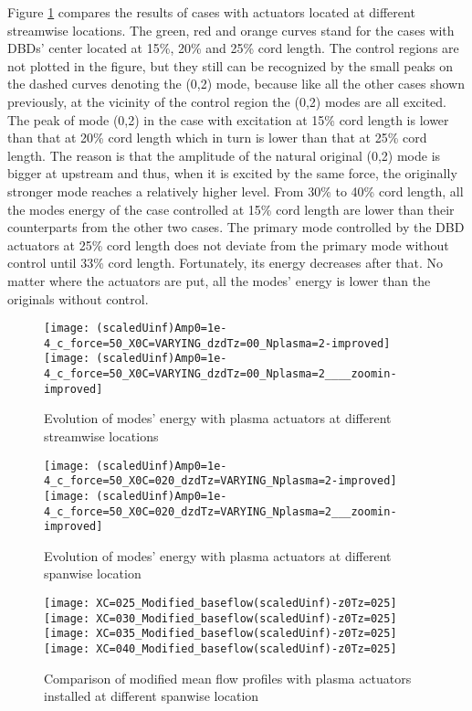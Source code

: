 \documentclass{AIAA}
\begin{document}
Figure \ref{f:streamwiselocationeffect} compares the results of cases with actuators located at different streamwise locations. The green, red and orange curves stand for the cases with DBDs' center located at 15\%, 20\% and 25\% cord length. The control regions are not plotted in the figure, but they still can be recognized by the small peaks on the dashed curves denoting the (0,2) mode, because like all the other cases shown previously, at the vicinity of the control region the (0,2) modes are all excited. The peak of mode (0,2) in the case with excitation at 15\% cord length is lower than that at 20\% cord length which in turn is lower than that at 25\% cord length. The reason is that the amplitude of the natural original (0,2) mode is bigger at upstream and thus, when it is excited by the same force, the originally stronger mode reaches a relatively higher level. From 30\% to 40\% cord length, all the modes energy of the case controlled at 15\% cord length are lower than their counterparts from the other two cases. The primary mode controlled by the DBD actuators at 25\% cord length does not deviate from the primary mode without control until 33\% cord length. Fortunately, its energy decreases after that. No matter where the actuators are put, all the modes' energy is lower than the originals without control.
\begin{figure}
\centering
\texttt{[image: (scaledUinf)Amp0=1e-4\_c\_force=50\_X0C=VARYING\_dzdTz=00\_Nplasma=2-improved]}
\texttt{[image: (scaledUinf)Amp0=1e-4\_c\_force=50\_X0C=VARYING\_dzdTz=00\_Nplasma=2\_\_\_\_zoomin-improved]}
\caption{Evolution of modes' energy with plasma actuators at different streamwise locations}%
\label{f:streamwiselocationeffect}
\end{figure}
\begin{figure}
\centering
\texttt{[image: (scaledUinf)Amp0=1e-4\_c\_force=50\_X0C=020\_dzdTz=VARYING\_Nplasma=2-improved]}
\texttt{[image: (scaledUinf)Amp0=1e-4\_c\_force=50\_X0C=020\_dzdTz=VARYING\_Nplasma=2\_\_\_zoomin-improved]}
\caption{Evolution of modes' energy with plasma actuators at different spanwise location}%
\label{f:spanwiselocationeffect}
\end{figure}
\begin{figure}
\centering
\texttt{[image: XC=025\_Modified\_baseflow(scaledUinf)-z0Tz=025]}
\texttt{[image: XC=030\_Modified\_baseflow(scaledUinf)-z0Tz=025]}
\texttt{[image: XC=035\_Modified\_baseflow(scaledUinf)-z0Tz=025]}
\texttt{[image: XC=040\_Modified\_baseflow(scaledUinf)-z0Tz=025]}
\caption{Comparison of modified mean flow profiles with plasma actuators installed at different spanwise location}%
\end{figure}
\end{document}
